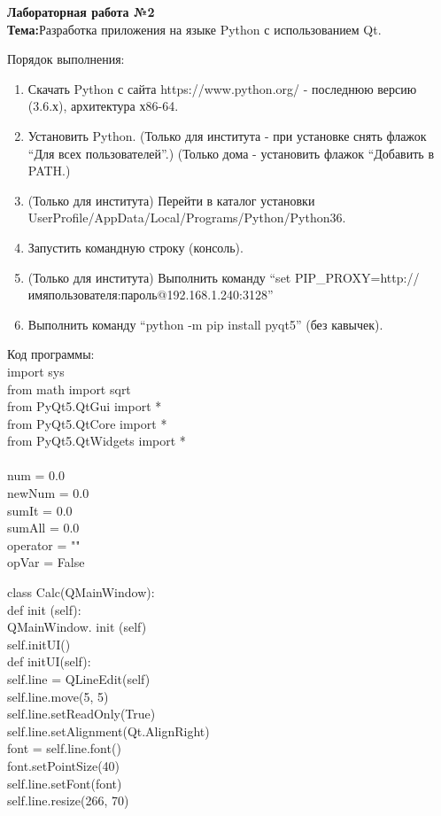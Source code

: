 
\begin{center}
\textbf{Лабораторная работа №2}
\\
\textbf{Тема:}Разработка приложения на языке Python с использованием Qt.
\\

\end{center}

Порядок выполнения:
\begin{enumerate}

\item Скачать Python с сайта https://www.python.org/ - последнюю версию (3.6.х), архитектура х86-64.
\item Установить Python. (Только для института - при установке снять флажок “Для всех пользователей”.) (Только дома - установить флажок “Добавить в PATH.)
\item (Только для института) Перейти в каталог установки UserProfile/AppData/Local/Programs/Python/Python36.
\item Запустить командную строку (консоль).
\item (Только для института) Выполнить команду “set PIP\_PROXY=http://имяпользователя:пароль@192.168.1.240:3128”
\item Выполнить команду “python -m pip install pyqt5” (без кавычек).
\\
\end{enumerate}

Код программы:
\\
import sys \\
from math import sqrt\\
from PyQt5.QtGui import *\\
from PyQt5.QtCore import *\\
from PyQt5.QtWidgets import *\\
\\
num = 0.0\\
newNum = 0.0\\
sumIt = 0.0\\
sumAll = 0.0\\
operator = ""\\
opVar = False

class Calc(QMainWindow):\\

    def init (self):\\
        QMainWindow. init (self)\\
        self.initUI()\\

def initUI(self):\\
        self.line = QLineEdit(self)\\
        self.line.move(5, 5)\\
        self.line.setReadOnly(True)\\
        self.line.setAlignment(Qt.AlignRight)\\
        font = self.line.font()\\
        font.setPointSize(40)\\
        self.line.setFont(font)\\
        self.line.resize(266, 70)\\


